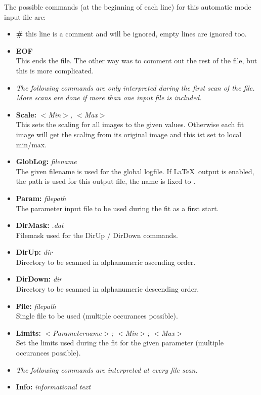 \documentclass[11pt]{article} %
\begin{document}
The possible commands (at the beginning of each line) for this automatic mode input file are:
\begin{itemize}\itemsep0pt
\item {\bf \#} this line is a comment and will be ignored, empty lines are ignored too.
\item {\bf EOF} \\
	This ends the file. The other way was to comment out the rest of the file, but this is more complicated.
\item[] {\it The following commands are only interpreted during the first scan of the file. More scans are done if more than one input file is included.}
\item {\bf Scale:} {\it $<$Min$>$, $<$Max$>$} \\
	This sets the scaling for all images to the given values. Otherwise each fit image will get the scaling from its original image and this ist set to local min/max.
\item {\bf GlobLog:} {\it filename} \\
	The given filename is used for the global logfile. If \LaTeX\  output is enabled, the path is used for this output file, the name is fixed to .
\item {\bf Param:} {\it filepath} \\
	The parameter input file to be used during the fit as a first start.
\item {\bf DirMask:} {\it *.dat} \\
	Filemask used for the DirUp / DirDown commands.
\item {\bf DirUp:} {\it dir} \\
	Directory to be scanned in alphanumeric ascending order.
\item {\bf DirDown:} {\it dir} \\
	Directory to be scanned in alphanumeric descending order.
\item {\bf File:} {\it filepath} \\
	Single file to be used (multiple occurances possible).
\item {\bf Limits:} {\it $<$Parametername$>$; $<$Min$>$; $<$Max$>$} \\
	Set the limits used during the fit for the given parameter (multiple occurances possible).
\item[] {\it The following commands are interpreted at every file scan.}
\item {\bf Info:} {\it informational text} \\

\end{itemize}
\end{document}
